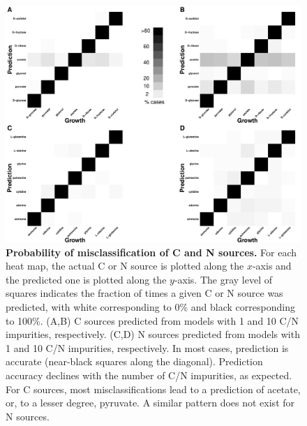 \documentclass[12pt]{article}
\begin{document}
\clearpage
\begin{figure}[p]
\centerline{\includegraphics[width=5in]{Figures/heatmap.pdf}}
\caption{\label{fig:heat_map}\textbf{Probability of misclassification of C and N sources.} For each heat map, the actual C or N source is plotted along the $x$-axis and the predicted one is plotted along the $y$-axis. The gray level of squares indicates the fraction of times a given C or N source was predicted, with white corresponding to 0\% and black corresponding to 100\%. (A,B) C sources predicted from models with 1 and 10 C/N impurities, respectively. (C,D) N sources predicted from models with 1 and 10 C/N impurities, respectively. In most cases, prediction is accurate (near-black squares along the diagonal). Prediction accuracy declines with the number of C/N impurities, as expected. For C sources, most misclassifications lead to a prediction of acetate, or, to a lesser degree, pyruvate. A similar pattern does not exist for N sources.}
\end{figure}
\end{document}
